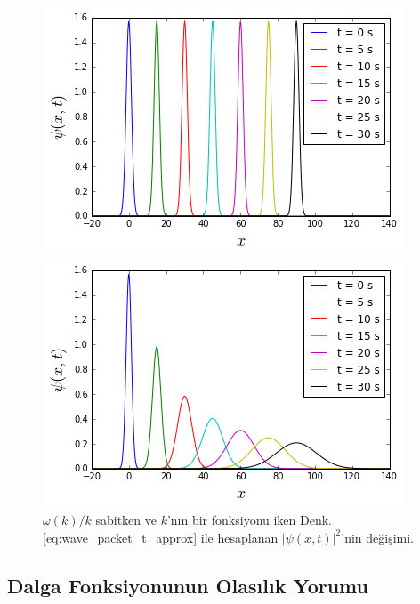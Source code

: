\documentclass[a4paper,12pt, twoside]{article}
\begin{document}
\begin{figure}[hbtp]
\begin{minipage}{.5\textwidth}
\center
\includegraphics[scale=.6]{wave_packet_w_eq_kc.png}
\end{minipage}
\begin{minipage}{.5\textwidth}
\center
\includegraphics[scale=.6]{wave_packet_w_eq_function_of_k.png}
\end{minipage}
\caption{$\omega(k)/k$ sabitken ve $k$'nın bir fonksiyonu iken Denk. \ref{eq:wave_packet_t_approx} ile hesaplanan $|\psi(x,t)|^2$'nin değişimi.}
\label{fig:wave_packet_t}
\end{figure}

\subsection{Dalga Fonksiyonunun Olasılık Yorumu}
\end{document}
